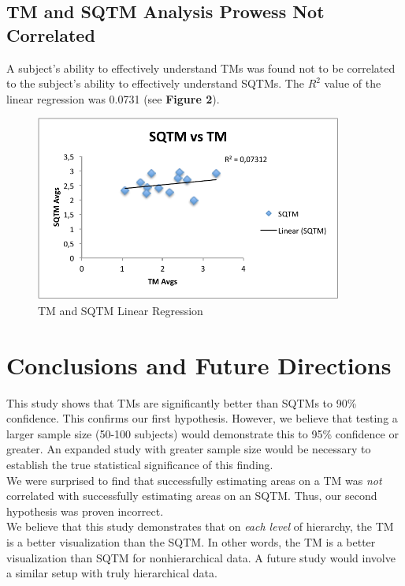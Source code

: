 \documentclass{article}
\begin{document}
\subsection*{TM and SQTM Analysis Prowess Not Correlated}
A subject's ability to effectively understand TMs was found not to be correlated to the subject's ability to effectively understand SQTMs. The $R^2$ value of the linear regression was 0.0731 (see \textbf{Figure 2}).

\begin{figure}
\includegraphics[width=0.9\textwidth]{sqtmvstm.pdf}
\caption{TM and SQTM Linear Regression}
\end{figure}

\section*{Conclusions and Future Directions}
This study shows that TMs are significantly better than SQTMs to 90\% confidence. This confirms our first hypothesis. However, we believe that testing a larger sample size (50-100 subjects) would demonstrate this to 95\% confidence or greater. An expanded study with greater sample size would be necessary to establish the true statistical significance of this finding. \\

We were surprised to find that successfully estimating areas on a TM was \emph{not} correlated with successfully estimating areas on an SQTM. Thus, our second hypothesis was proven incorrect. \\

We believe that this study demonstrates that on \emph{each level} of hierarchy, the TM is a better visualization than the SQTM. In other words, the TM is a better visualization than SQTM for nonhierarchical data. A future study would involve a similar setup with truly hierarchical data.
\end{document}
